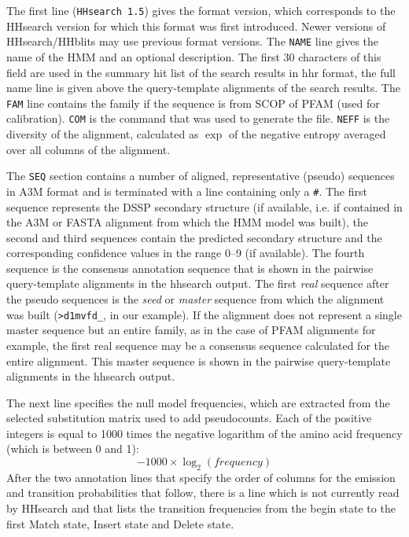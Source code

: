 \documentclass[11pt,a4paper]{article}
\begin{document}
The first line (\verb`HHsearch 1.5`) gives the format version, which corresponds to the HHsearch version for which this format was first introduced. Newer versions of HHsearch/HHblits may use previous format versions. The \verb`NAME` line gives the name of the HMM and an optional description. The first 30 characters of this field are used in the summary hit list of the search results in hhr format, the full name line is given above the query-template alignments of the search results. The \verb`FAM` line contains the family if the sequence is from SCOP of PFAM (used for calibration). \verb`COM` is the command that was used to generate the file. \verb`NEFF` is the diversity of the alignment, calculated as $\exp$ of the negative entropy averaged over all columns of the alignment. 

The \verb`SEQ` section contains a number of aligned, representative (pseudo) sequences in A3M format and is terminated with a line containing only a \verb`#`. The first sequence represents the DSSP secondary structure (if available, i.e. if contained in the A3M or FASTA alignment from which the HMM model was built), the second and third sequences contain the predicted secondary structure and the corresponding confidence values in the range 0--9 (if available). The fourth sequence is the consensus annotation sequence that is shown in the pairwise query-template alignments in the hhsearch output. The first \emph{real} sequence after the pseudo sequences is the \emph{seed} or \emph{master} sequence from which the alignment was built (\verb`>d1mvfd_`, in our example). If the alignment does not represent a single master sequence but an entire family, as in the case of PFAM alignments for example, the first real sequence may be a consensus sequence calculated for the entire alignment. This master sequence is shown in the pairwise query-template alignments in the hhsearch output. 

The next line specifies the null model frequencies, which are extracted from the selected substitution matrix used to add pseudocounts. Each of the positive integers is equal to 1000 times the negative logarithm of the amino acid frequency (which is between 0 and 1):
\begin{equation}
  -1000 \times \log_2( frequency)
  \label{transformation}
\end{equation}
 After the two annotation lines that specify the order of columns for the emission and transition probabilities that follow, there is a line which is not currently read by HHsearch and that lists the transition frequencies from the begin state to the first Match state, Insert state and Delete state.
\end{document}
